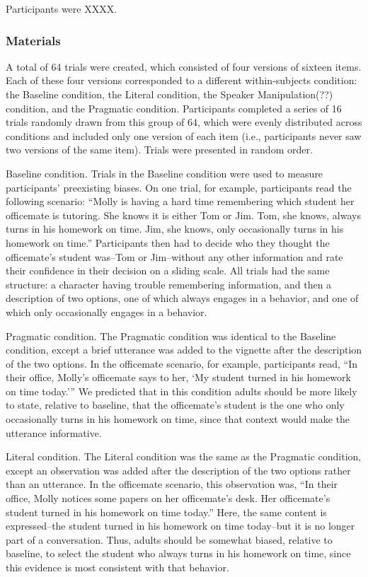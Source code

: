 \documentclass[10pt,letterpaper]{article}
\begin{document}
Participants were XXXX.

\subsubsection{Materials}

A total of 64 trials were created, which consisted of four versions of sixteen items.  Each of these four versions corresponded to a different within-subjects condition: the Baseline condition, the Literal condition, the Speaker Manipulation(??) condition, and the Pragmatic condition.  Participants completed a series of 16 trials randomly drawn from this group of 64, which were evenly distributed across conditions and included only one version of each item (i.e., participants never saw two versions of the same item).  Trials were presented in random order.

Baseline condition. Trials in the Baseline condition were used to measure participants’ preexisting biases.  On one trial, for example, participants read the following scenario: “Molly is having a hard time remembering which student her officemate is tutoring.  She knows it is either Tom or Jim. Tom, she knows, always turns in his homework on time.  Jim, she knows, only occasionally turns in his homework on time.”  Participants then had to decide who they thought the officemate’s student was--Tom or Jim--without any other information and rate their confidence in their decision on a sliding scale.  All trials had the same structure: a character having trouble remembering information, and then a description of two options, one of which always engages in a behavior, and one of which only occasionally engages in a behavior.

Pragmatic condition. The Pragmatic condition was identical to the Baseline condition, except a brief utterance was added to the vignette after the description of the two options.  In the officemate scenario, for example, participants read, “In their office, Molly’s officemate says to her, ‘My student turned in his homework on time today.’”  We predicted that in this condition adults should be more likely to state, relative to baseline, that the officemate’s student is the one who only occasionally turns in his homework on time, since that context would make the utterance informative.

Literal condition. The Literal condition was the same as the Pragmatic condition, except an observation was added after the description of the two options rather than an utterance.  In the officemate scenario, this observation was, “In their office, Molly notices some papers on her officemate's desk. Her officemate's student turned in his homework on time today.”  Here, the same content is expressed--the student turned in his homework on time today--but it is no longer part of a conversation.  Thus, adults should be somewhat biased, relative to baseline, to select the student who always turns in his homework on time, since this evidence is most consistent with that behavior.
\end{document}
